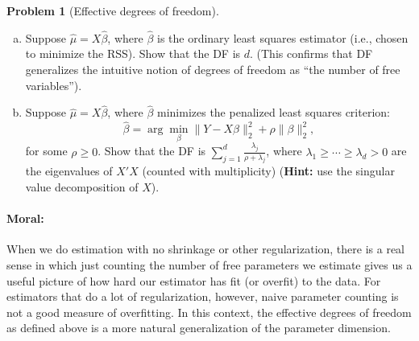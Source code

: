 \documentclass{article}
\theoremstyle{definition}
\newtheorem{problem}{Problem}
\begin{document}
\begin{problem}[Effective degrees of freedom]
\begin{enumerate}[(a)]
\item Suppose $\hat\mu = X\hat\beta$, where $\hat\beta$ is the ordinary least squares estimator (i.e., chosen to minimize the RSS). Show that the DF is $d$. (This confirms that DF generalizes the intuitive notion of degrees of freedom as ``the number of free variables'').




\item Suppose $\hat\mu = X\hat\beta$, where $\hat\beta$ minimizes the penalized least squares criterion:
\[
\hat\beta = \arg\min_\beta \|Y - X\beta\|_2^2 + \rho \|\beta\|_2^2,
\]
for some $\rho \geq 0$. Show that the DF is $\sum_{j=1}^d \frac{\lambda_j}{\rho+\lambda_j}$, where $\lambda_1 \geq \cdots \geq \lambda_d > 0$ are the eigenvalues of $X'X$ (counted with multiplicity) ({\bf Hint:} use the singular value decomposition of $X$).




\end{enumerate}

\paragraph{Moral:} When we do estimation with no shrinkage or other regularization, there is a real sense in which just counting the number of free parameters we estimate gives us a useful picture of how hard our estimator has fit (or overfit) to the data. For estimators that do a lot of regularization, however, naive parameter counting is not a good measure of overfitting. In this context, the effective degrees of freedom as defined above is a more natural generalization of the parameter dimension.
\end{problem}
\end{document}
